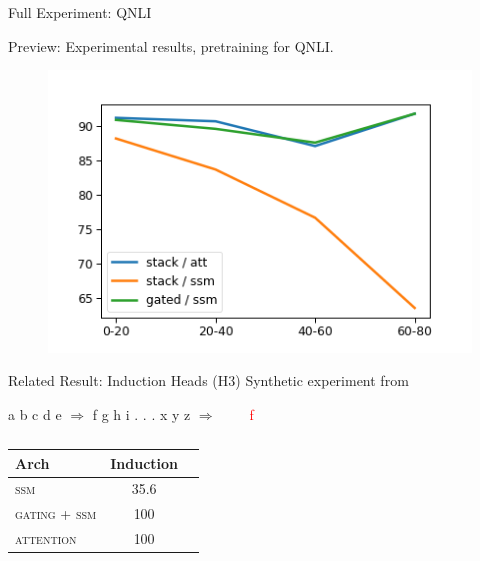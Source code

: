 \documentclass[14pt,aspectratio=169]{beamer}
\begin{document}
\begin{frame}{Full Experiment: QNLI}

Preview: Experimental results, pretraining for QNLI.

\begin{figure}
    \centering
    \includegraphics[height=0.7\textheight]{Figs/graph.png}
    \label{fig:my_label}
\end{figure}
\end{frame}

\begin{frame}{Related Result: Induction Heads (H3)}
    Synthetic  experiment from \cite{dao2022hungry}

    \vspace{0.5cm}
    
    \centerline{a b c d e $\Rightarrow$ f g h i . . . x y z $\Rightarrow$  \ \ \ \  \textcolor{red}{f} }

    \begin{table}[t]
\center
    \begin{tabular}{lcc}
    \toprule
    \centering
     Arch  & Induction \\    
    \midrule
                \textsc{ssm} & 35.6 \\
         \textsc{gating} + \textsc{ssm} & 100\\
         \textsc{attention} & 100\\
    \bottomrule
    \end{tabular}
    \caption{ }
    \label{tab:synthetic}
\end{table}
\end{frame}
\end{document}
